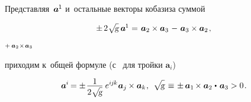 \begin{otherlanguage}{russian}
Представляя~${\bm{a}^{\hspace{-0.1ex}1}\hspace{-0.1ex}}$ и~остальные векторы кобазиза суммой

\nopagebreak\vspace{.8em}\begin{equation*}
\begin{array}{l@{\hspace{.3em}}c@{\hspace{.36em}}r}
\pm \hspace{.33ex} 2 \hspace{.1ex} \scalebox{0.95}[0.96]{$\sqrt{\hspace{-0.36ex}\mathstrut{\textsl{g}}}$} \hspace{.5ex} \bm{a}^{\hspace{-0.1ex}1} & = & \bm{a}_2 \times \bm{a}_3 \hspace{.2ex} \tikzmark{BeginPlusToMinus} - \hspace{.2ex} \bm{a}_3 \times \bm{a}_2 \tikzmark{EndPlusToMinus}
\hspace{.2ex} ,
\end{array}
\end{equation*}%
%
{${\scriptstyle {+ \hspace{.4ex} \bm{a}_2 \hspace{.1ex} \times \hspace{.2ex} \bm{a}_3}}$}

\vspace{-1.3em}\noindent
приходим к~общей формуле (с~\inquotes{$-$} для  тройки ${\bm{a}_i}$)

\nopagebreak\begin{equation}\label{basisvectorstocobasisvectors}
\bm{a}^{\hspace{-0.05ex}i} \hspace{-0.2ex}
= \displaystyle \pm \hspace{.2ex} \frac{\raisemath{-0.4ex}{1}}{2 \hspace{.1ex} \scalebox{0.95}[0.96]{$\sqrt{\hspace{-0.36ex}\mathstrut{\textsl{g}}}$}} \hspace{.5ex} e^{i\hspace{-0.1ex}j\hspace{-0.1ex}k} \hspace{.1ex} \bm{a}_j \hspace{-0.1ex} \times \bm{a}_k \hspace{.1ex},
\:\:
\sqrt{\hspace{-0.36ex}\mathstrut{\textsl{g}}} \hspace{.25ex}
\equiv \hspace{.15ex} \pm \hspace{.4ex} \bm{a}_1 \hspace{-0.2ex} \times \bm{a}_2 \hspace{.1ex} \dotp \hspace{.25ex} \bm{a}_3
> 0
\hspace{.2ex} .
\end{equation}


\end{otherlanguage}
